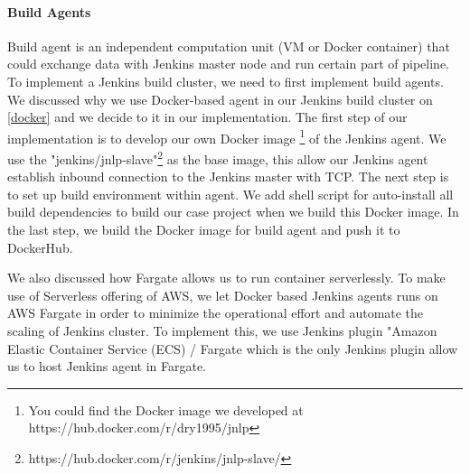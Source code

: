 \paragraph[]{Build Agents}
Build agent is an independent computation unit (VM or Docker container) that could exchange data with Jenkins master node and run certain part of pipeline. To implement a Jenkins build cluster, we need to first implement build agents.
We discussed why we use Docker-based agent in our Jenkins build cluster on \ref{docker} and we decide to it in our implementation. The first step of our implementation is to develop our own Docker image \footnote{You could find the Docker image we developed at https://hub.docker.com/r/dry1995/jnlp} of the Jenkins agent. We use the "jenkins/jnlp-slave"\footnote{https://hub.docker.com/r/jenkins/jnlp-slave/} as the base image, this allow our Jenkins agent establish inbound connection to the Jenkins master with TCP. The next step is to set up build environment within agent. We add shell script for auto-install all build dependencies to build our case project when we build this Docker image. In the last step, we build the Docker image for build agent and push it to DockerHub. 
\par
We also discussed how Fargate allows us to run container serverlessly. To make use of Serverless offering of AWS, we let Docker based Jenkins agents runs on AWS Fargate in order to minimize the operational effort and automate the scaling of Jenkins cluster. To implement this, we use Jenkins plugin "Amazon Elastic Container Service (ECS) / Fargate which is the only Jenkins plugin allow us to host Jenkins agent in Fargate.  
